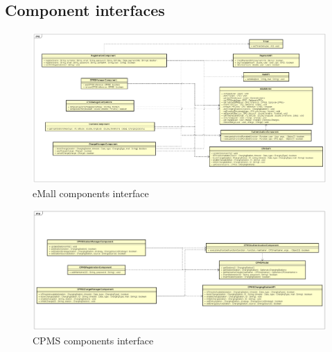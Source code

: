 \subsection{Component interfaces}
\begin{figure}[!h]
    \begin{center}
        \includegraphics[keepaspectratio, width=16cm]{Interface/eMallInterface.png}
        \caption{\ac{eMall} components interface}
        \label{fig:emall-interface}
    \end{center}
\end{figure}
\begin{figure}[!h]
    \begin{center}
        \includegraphics[keepaspectratio, width=16cm]{Interface/CPMSInterface.png}
        \caption{\ac{CPMS} components interface}
        \label{fig:emall-interface}
    \end{center}
\end{figure}
\clearpage

